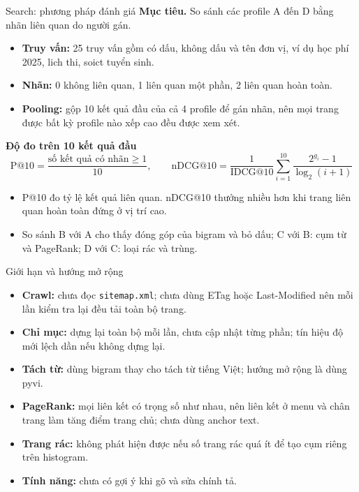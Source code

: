 \documentclass[aspectratio=169,t,10pt]{beamer}
\newcommand{\code}[1]{\texttt{#1}}
\newcommand{\ex}[1]{{\ttfamily\footnotesize #1}}
\newcommand{\muctieu}[1]{\noindent\textbf{Mục tiêu.} #1\par\vspace{4pt}}
\begin{document}
\begin{frame}[shrink]{Search: phương pháp đánh giá}
\small
\muctieu{So sánh các profile A đến D bằng nhãn liên quan do người gán.}
\begin{itemize}
  \item \textbf{Truy vấn:} 25 truy vấn gồm có dấu, không dấu và tên đơn vị, ví dụ \ex{học phí 2025}, \ex{lich thi}, \ex{soict tuyển sinh}.
  \item \textbf{Nhãn:} 0 không liên quan, 1 liên quan một phần, 2 liên quan hoàn toàn.
  \item \textbf{Pooling:} gộp 10 kết quả đầu của cả 4 profile để gán nhãn, nên mọi trang được bất kỳ profile nào xếp cao đều được xem xét.
\end{itemize}
\vspace{4pt}
\textbf{Độ đo trên 10 kết quả đầu}
$$\mathrm{P@10}=\frac{\text{số kết quả có nhãn}\ge 1}{10}, \qquad \mathrm{nDCG@10}=\frac{1}{\mathrm{IDCG@10}}\sum_{i=1}^{10}\frac{2^{g_i}-1}{\log_2(i+1)}$$
\begin{itemize}
  \item P@10 đo tỷ lệ kết quả liên quan. nDCG@10 thưởng nhiều hơn khi trang liên quan hoàn toàn đứng ở vị trí cao.
  \item So sánh B với A cho thấy đóng góp của bigram và bỏ dấu; C với B: cụm từ và PageRank; D với C: loại rác và trùng.
\end{itemize}
\end{frame}

\begin{frame}{Giới hạn và hướng mở rộng}
\begin{itemize}
  \setlength{\itemsep}{5pt}
  \item \textbf{Crawl:} chưa đọc \code{sitemap.xml}; chưa dùng ETag hoặc Last-Modified nên mỗi lần kiểm tra lại đều tải toàn bộ trang.
  \item \textbf{Chỉ mục:} dựng lại toàn bộ mỗi lần, chưa cập nhật từng phần; tín hiệu độ mới lệch dần nếu không dựng lại.
  \item \textbf{Tách từ:} dùng bigram thay cho tách từ tiếng Việt; hướng mở rộng là dùng pyvi.
  \item \textbf{PageRank:} mọi liên kết có trọng số như nhau, nên liên kết ở menu và chân trang làm tăng điểm trang chủ; chưa dùng anchor text.
  \item \textbf{Trang rác:} không phát hiện được nếu số trang rác quá ít để tạo cụm riêng trên histogram.
  \item \textbf{Tính năng:} chưa có gợi ý khi gõ và sửa chính tả.
\end{itemize}
\end{frame}
\end{document}
